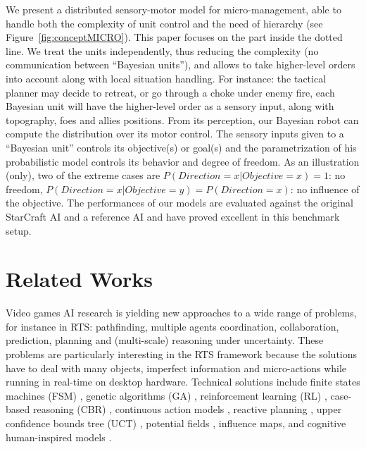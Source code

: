 We present a distributed sensory-motor model for micro-management, able to handle both the complexity of unit control and the need of hierarchy (see Figure~\ref{fig:conceptMICRO}). This paper focuses on the part inside the dotted line. We treat the units independently, thus reducing the complexity (no communication between ``Bayesian units''), and allows to take higher-level orders into account along with local situation handling. For instance: the tactical planner may decide to retreat, or go through a choke under enemy fire, each Bayesian unit will have the higher-level order as a sensory input, along with topography, foes and allies positions. From its perception, our Bayesian robot \cite{Lebeltel04} can compute the distribution over its motor control. The sensory inputs given to a ``Bayesian unit'' controls its objective(s) or goal(s) and the parametrization of his probabilistic model controls its behavior and degree of freedom. As an illustration (only), two of the extreme cases are $P(Direction=x|Objective=x)=1$: no freedom, $P(Direction=x|Objective=y)=P(Direction=x)$: no influence of the objective. The performances of our models are evaluated against the original StarCraft AI and a reference AI and have proved excellent in this benchmark setup.


\section{Related Works}

Video games AI research is yielding new approaches to a wide range of problems, for instance in RTS: pathfinding, multiple agents coordination, collaboration, prediction, planning and (multi-scale) reasoning under uncertainty. These problems are particularly interesting in the RTS framework because the solutions have to deal with many objects, imperfect information and micro-actions while running in real-time on desktop hardware. Technical solutions include finite states machines (FSM) \citep{FSM}, genetic algorithms (GA) \citep{GA,teamCompositionRTS}, reinforcement learning (RL) \citep{Marthi05concurrenthierarchical,Madeira06}, case-based reasoning (CBR) \citep{LTW,CBR-RL}, continuous action models \citep{Molineaux08}, reactive planning \citep{WeberCIG10}, upper confidence bounds tree (UCT) \citep{UCT}, potential fields \citep{Hagelback2009}, influence maps\citep{teamCompositionRTS}, and cognitive human-inspired models \citep{SORTS}.

